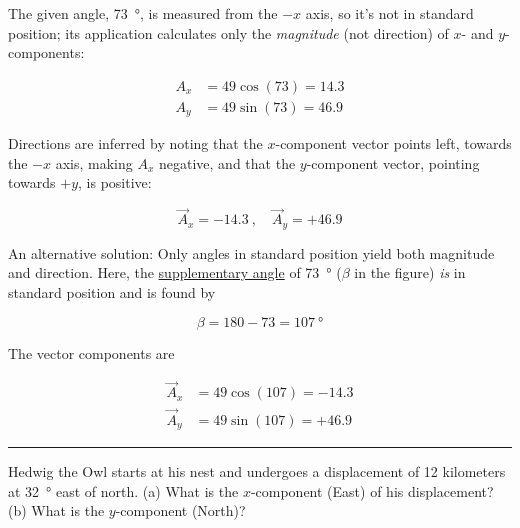\documentclass[main-physics.tex]{subfiles}
\begin{document}
The given angle, \SI{73}{\degree}, is measured from the $-x$ axis, so it's not in standard position; its application calculates only the \textit{magnitude} (not direction) of $x$- and $y$-components: 


\begin{align*}
    A_x &= 49 \cos{(73)} = 14.3\\[1ex]
    A_y &= 49 \sin{(73)} = 46.9
\end{align*}


Directions are inferred by noting that the $x$-component vector points left, towards the $-x$ axis, making $A_x$ negative, and that the $y$-component vector, pointing towards $+y$, is positive:

\begin{equation*}
    \vec{A}_x = -14.3\ , \hspace{1em}
    \vec{A}_y = +46.9
\end{equation*}

An alternative solution: Only angles in standard position yield both magnitude and direction. Here, the \href{https://mathworld.wolfram.com/SupplementaryAngles.html}{supplementary angle} of \SI{73}{\degree} ($\beta$ in the figure) \textit{is} in standard position and is found by

\begin{equation*}
    \beta = 180 - 73 = \SI{107}{\degree}
\end{equation*}

The vector components are

\begin{align*}
    \vec{A}_x &= 49 \cos{(107)} = -14.3\\[1ex]
    \vec{A}_y &= 49 \sin{(107)} = +46.9
\end{align*}

\hrule

\begin{example}
    Hedwig the Owl starts at his nest and undergoes a displacement of 12 kilometers at \SI{32}{\degree} east of north. (a) What is the $x$-component (East) of his displacement? (b) What is the $y$-component (North)?
\end{example}

\Solution
\end{document}
